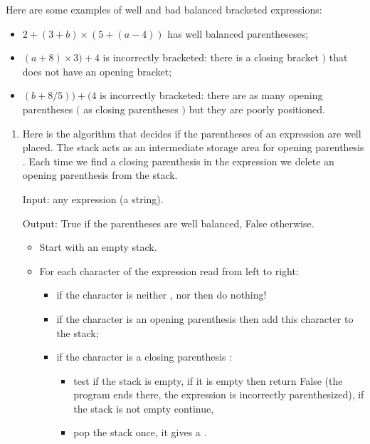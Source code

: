\documentclass[11pt,class=report,crop=false]{standalone}
\begin{document}
\begin{activite}


Here are some examples of well and bad balanced bracketed expressions:
\begin{itemize}
  \item $2 + (3 + b) \times (5 + (a - 4))$ has well balanced parentheseses;
  \item $(a+ 8) \times 3 ) + 4$ is incorrectly bracketed: there is a closing bracket \og{}$)$\fg{} that does not have an opening bracket;
  \item $(b + 8 / 5)) + (4$ is incorrectly bracketed: there are as many opening parentheses  \og{}$($\fg{} as closing parentheses \og{}$)$\fg{} but they are poorly positioned.
\end{itemize}

\begin{enumerate}
  \item 
 
  Here is the algorithm that decides if the parentheses of an expression are well placed. 
  The stack acts as an intermediate storage area for opening parenthesis . Each time we find a closing parenthesis  in the expression we delete an opening parenthesis from the stack.
  
  \begin{algorithme}
  Input: any expression (a string).
  
  Output: \og{}True\fg{} if the parentheses are well balanced, \og{}False\fg{} otherwise. 
  
  \begin{itemize}
   \item Start with an empty stack.   
   
   \item For each character of the expression read from left to right:
   \begin{itemize}
     \item if the character is neither , nor  then do nothing!
     
     \item if the character is an opening parenthesis  then add this character to the stack;
     
     \item if the character is a closing parenthesis :
       \begin{itemize}
         \item test if the stack is empty, if it is empty then return \og{}False\fg{} (the program ends there, the expression is incorrectly parenthesized), if the stack is not empty continue, 
         \item pop the stack once, it gives a .
       \end{itemize}
     \end{itemize} 
       

\end{itemize}
\end{algorithme}
\end{enumerate}
\end{activite}
\end{document}
